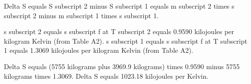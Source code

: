 Delta S equals S subscript 2 minus S subscript 1 equals m subscript 2 times s subscript 2 minus m subscript 1 times s subscript 1.  

s subscript 2 equals s subscript f at T subscript 2 equals 0.9590 kilojoules per kilogram Kelvin (from Table A2).  
s subscript 1 equals s subscript f at T subscript 1 equals 1.3069 kilojoules per kilogram Kelvin (from Table A2).  

Delta S equals (5755 kilograms plus 3969.9 kilograms) times 0.9590 minus 5755 kilograms times 1.3069.  
Delta S equals 1023.18 kilojoules per Kelvin.